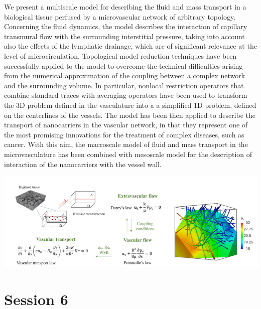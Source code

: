 \documentclass{article}
\begin{document}
{
We present a multiscale model for describing the fluid and mass transport
in a biological tissue perfused by a microvascular network of arbitrary topology.
Concerning the fluid dynamics, the model describes the interaction of capillary
transmural flow with the surrounding interstitial pressure, taking into account
also the effects of the lymphatic drainage, which are of significant relevance at
the level of microcirculation. Topological model reduction techniques have been
successfully applied to the model to overcome the technical difficulties arising
from the numerical approximation of the coupling between a complex network
and the surrounding volume. In particular, nonlocal restriction operators that
combine standard traces with averaging operators have been used to transform
the 3D problem defined in the vasculature into a a simplified 1D problem, defined on the centerlines of the vessels.
The model has been then applied to describe the transport of nanocarriers in
the vascular network, in that they represent one of the most promising innovations for the treatment of complex diseases, such as cancer. With this aim,
the macroscale model of fluid and mass transport in the microvasculature has
been combined with mesoscale model for the description of interaction of the
nanocarriers with the vessel wall.

\begin{center}
\includegraphics[width=1.0\textwidth]{image1.png} 

\end{center}

}



\clearpage
\section*{Session 6}
\end{document}
